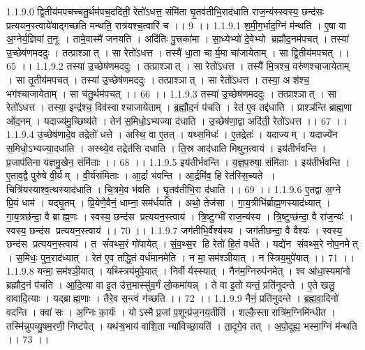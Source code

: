1.1.9.0
द्वि॒तीय॑मपचच्चतु॒र्थम॑पच॒ददि॑ती॒ रेतो॑ऽधत्त॒ संमि॑ता घृ॒तव॑तीभि॒राद॑धाति राज॒न्य॑स्स्वस्य॒ छन्द॑सः प्रत्ययन॒स्त्वाये॑याद्गच्छति मन्थति॒ रात्र॑यश्च॒त्वारि॑ च ।। 9 ।।
1.1.9.1
श॒मी॒ग॒र्भाद॒ग्निं म॑न्थति । ए॒षा वा अ॒ग्नेर्य॒ज्ञिया॑ त॒नूः । तामे॒वास्मै॑ जनयति । अदि॑तिः पु॒त्त्रका॑मा । सा॒ध्येभ्यो॑ दे॒वेभ्यो ब्रह्मौद॒नम॑पचत् । तस्या॑ उ॒च्छेष॑णमददुः । तत्प्राश्ञात् । सा रेतो॑ऽधत्त । तस्यै॑ धा॒ता चार्य॒मा चा॑जायेताम् । सा द्वि॒तीय॑मपचत् ।। 65 ।।
1.1.9.2
तस्या॑ उ॒च्छेष॑णमददुः । तत्प्राश्ञात् । सा रेतो॑ऽधत्त । तस्यै॑ मि॒त्रश्च॒ वरु॑णश्चाजायेताम् । सा तृ॒तीय॑मपचत् । तस्या॑ उ॒च्छेष॑णमददुः । तत्प्राश्ञात् । सा रेतो॑ऽधत्त । तस्या॒ अश॑श्च॒ भग॑श्चाजायेताम् । सा च॑तु॒र्थम॑पचत् ।। 66 ।।
1.1.9.3
तस्या॑ उ॒च्छेष॑णमददुः । तत्प्राश्ञात् । सा रेतो॑ऽधत्त । तस्या॒ इन्द्र॑श्च॒ विव॑स्वाश्चाजायेताम् । ब्र॒ह्मौ॒द॒नं प॑चति । रेत॑ ए॒व तद्द॑धाति । प्राश्ञ॑न्ति ब्राह्म॒णा ओ॑द॒नम् । यदाज्य॑मु॒च्छिष्य॑ते । तेन॑ स॒मिधो॒ऽभ्यज्या द॑धाति । उ॒च्छेष॑णा॒द्वा अदि॑ती॒ रेतो॑ऽधत्त ।। 67 ।।
1.1.9.4
उ॒च्छेष॑णादे॒व तद्रेतो॑ धत्ते । अस्थि॒ वा ए॒तत् । यथ्स॒मिधः॑ । ए॒तद्रेतः॑ । यदाज्यम् । यदाज्ये॑न स॒मिधो॒ऽभ्यज्या॒दधा॑ति । अस्थ्ये॒व तद्रेत॑सि दधाति । ति॒स्र आद॑धाति मिथुन॒त्वाय॑ । इय॑तीर्भवन्ति । प्र॒जाप॑तिना यज्ञमु॒खेन॒ संमि॑ताः ।। 68 ।।
1.1.9.5
इय॑तीर्भवन्ति । य॒ज्ञ॒प॒रुषा॒ संमि॑ताः । इय॑तीर्भवन्ति । ए॒ताव॒द्वै पुरु॑षे वी॒र्यम् । वी॒र्य॑संमिताः । आ॒र्द्रा भ॑वन्ति । आ॒र्द्रमि॑व॒ हि रेत॑स्सि॒च्यते । चित्रि॑यस्याश्व॒त्थस्याद॑धाति । चि॒त्रमे॒व भ॑वति । घृ॒तव॑तीभि॒रा द॑धाति ।। 69 ।।
1.1.9.6
ए॒तद्वा अ॒ग्ने प्रि॒यं धाम॑ । यद्घृ॒तम् । प्रि॒येणै॒वैनं॒ धाम्ना॒ सम॑र्धयति । अथो॒ तेज॑सा । गा॒य॒त्रीभि॑र्ब्राह्म॒णस्याद॑ध्यात् । गा॒य॒त्रछ॑न्दा॒ वै ब्राह्म॒णः । स्वस्य॒ छन्द॑स प्रत्ययन॒स्त्वाय॑ । त्रि॒ष्टुग्भी॑ राज॒न्य॑स्य । त्रि॒ष्टुप्छ॑न्दा॒ वै रा॑ज॒न्यः॑ । स्वस्य॒ छन्द॑स प्रत्ययन॒स्त्वाय॑ ।। 70 ।।
1.1.9.7
जग॑तीभि॒र्वैश्य॑स्य । जग॑तीछन्दा॒ वै वैश्यः॑ । स्वस्य॒ छन्द॑स प्रत्ययन॒स्त्वाय॑ । त सं॑वथ्स॒रं गो॑पायेत् । सं॒व॒थ्स॒र हि रेतो॑ हि॒तं वर्ध॑ते । यद्ये॑न संवथ्स॒रे नोप॒नमेत् । स॒मिधः॒ पुन॒राद॑ध्यात् । रेत॑ ए॒व तद्धि॒तं वर्ध॑मानमेति । न मा॒॒सम॑श्ञीयात् । न स्त्रिय॒मुपे॑यात् ।। 71 ।।
1.1.9.8
यन्मा॒॒सम॑श्ञी॒यात् । यथ्स्त्रिय॑मुपे॒यात् । निर्वीर्यस्स्यात् । नैन॑म॒ग्निरुप॑नमेत् । श्व आ॑धा॒स्यमा॑नो ब्रह्मौद॒नं प॑चति । आ॒दि॒त्या वा इ॒त उ॑त्त॒मास्सु॑व॒र्गं लो॒कमा॑यन्न् । ते वा इ॒तो यन्तं॒ प्रति॑नुदन्ते । ए॒ते खलु॒ वावादि॒त्याः । यद्ब्राह्म॒णाः । तैरे॒व स॒न्त्वं ग॑च्छति ।। 72 ।।
1.1.9.9
नैनं॒ प्रति॑नुदन्ते । ब्र॒ह्म॒वा॒दिनो॑ वदन्ति । क्वा॑ सः । अ॒ग्निः का॒र्यः॑ । योऽस्मै प्र॒जां प॒शून्प्र॑ज॒नय॒तीति॑ । शल्कै॒स्तारात्रि॑म॒ग्निमि॑न्धीत । तस्मि॑न्नुपव्यु॒षम॒रणी॒ निष्ट॑पेत् । यथ॑ऱ्ष॒भाय॑ वाशि॒ता न्या॑विच्छा॒यति॑ । ता॒दृगे॒व तत् । अ॒पो॒दूह्य॒ भस्मा॒ग्निं म॑न्थति ।। 73 ।।
